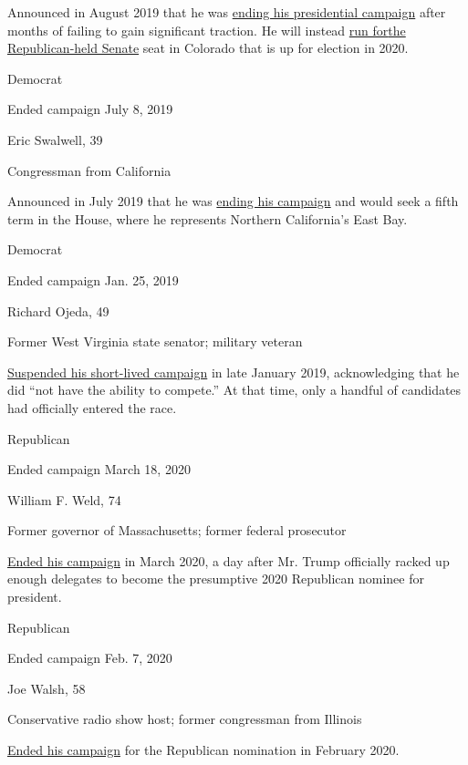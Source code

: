 Announced in August 2019 that he was
\href{https://www.nytimes3xbfgragh.onion/2019/08/15/us/politics/john-hickenlooper-drop-out-senate.html}{ending
his presidential campaign} after months of failing to gain significant
traction. He will instead
\href{https://www.nytimes3xbfgragh.onion/2019/08/22/us/politics/john-hickenlooper-senate-2020.html}{run
for}\href{https://www.nytimes3xbfgragh.onion/2019/08/22/us/politics/john-hickenlooper-senate-2020.html}{the
Republican-held Senate} seat in Colorado that is up for election in
2020.

Democrat

Ended campaign July 8, 2019

Eric Swalwell, 39

Congressman from California

Announced in July 2019 that he was
\href{https://www.nytimes3xbfgragh.onion/2019/07/08/us/politics/steyer-swalwell-2020.html}{ending
his campaign} and would seek a fifth term in the House, where he
represents Northern California's East Bay.

Democrat

Ended campaign Jan. 25, 2019

Richard Ojeda, 49

Former West Virginia state senator; military veteran

\href{https://www.facebookcorewwwi.onion/RichardOjeda2020/posts/2329884223911515}{Suspended
his short-lived campaign} in late January 2019, acknowledging that he
did ``not have the ability to compete.'' At that time, only a handful of
candidates had officially entered the race.

Republican

Ended campaign March 18, 2020

William F. Weld, 74

Former governor of Massachusetts; former federal prosecutor

\href{https://www.nytimes3xbfgragh.onion/2020/03/18/us/politics/bill-weld-drops-out.html}{Ended
his campaign} in March 2020, a day after Mr. Trump officially racked up
enough delegates to become the presumptive 2020 Republican nominee for
president.

Republican

Ended campaign Feb. 7, 2020

Joe Walsh, 58

Conservative radio show host; former congressman from Illinois

\href{https://www.nytimes3xbfgragh.onion/2020/02/07/us/politics/joe-walsh-drops-out.html}{Ended
his campaign} for the Republican nomination in February 2020.

